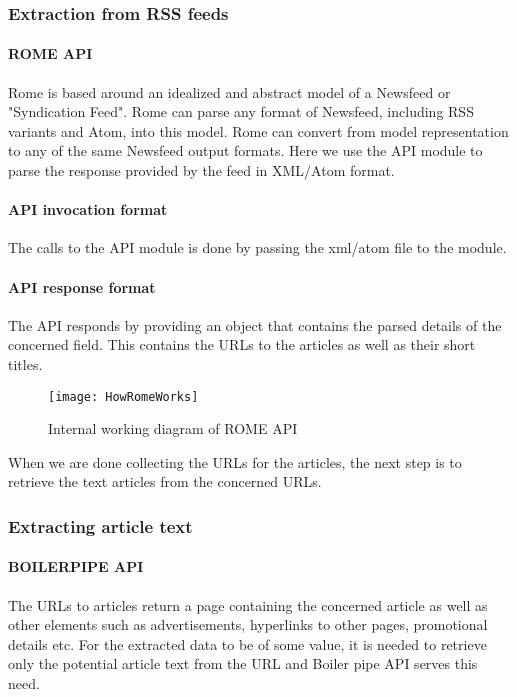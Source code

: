 \subsubsection{Extraction from RSS feeds}
\paragraph*{ROME API}
\hfill \break
Rome is based around an idealized and abstract model of a Newsfeed or "Syndication Feed". Rome can parse any format of Newsfeed, including RSS variants and Atom, into this model. Rome can convert from model representation to any of the same Newsfeed output formats. Here we use the API module to parse the response provided by the feed in XML/Atom format.

\paragraph*{API invocation format}
\hfill
\par The calls to the API module is done by passing the xml/atom file to the module.
\paragraph*{API response format}
\hfill \break
The API responds by providing an object that contains the parsed details of the concerned field. This contains the URLs to the articles as well as their short titles.
\begin{figure}[h]
	\texttt{[image: HowRomeWorks]}
	\centering
	\caption{Internal working diagram of ROME API}
\end{figure}
\par When we are done collecting the URLs for the articles, the next step is to retrieve the text articles from the concerned URLs. 

\subsubsection{Extracting article text}
\paragraph*{BOILERPIPE API}
\hfill \break
The URLs to articles return a page containing the concerned article as well as other elements such as advertisements, hyperlinks to other pages, promotional details etc. For the extracted data to be of some value, it is needed to retrieve only the potential article text from the URL and Boiler pipe API serves this need.
